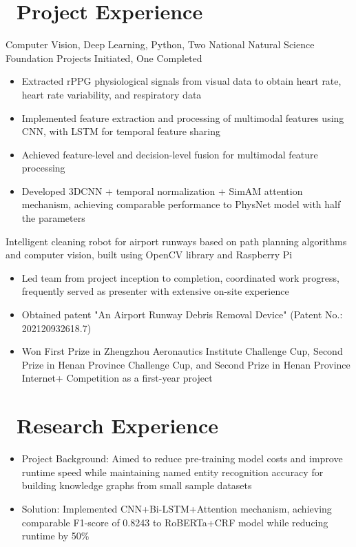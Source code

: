 \documentclass{resume}
\begin{document}
\section{\faUsers\ Project Experience}
Computer Vision, Deep Learning, Python, Two National Natural Science Foundation Projects Initiated, One Completed
\begin{itemize}
  \item Extracted rPPG physiological signals from visual data to obtain heart rate, heart rate variability, and respiratory data
  \item Implemented feature extraction and processing of multimodal features using CNN, with LSTM for temporal feature sharing
  \item Achieved feature-level and decision-level fusion for multimodal feature processing
  \item Developed 3DCNN + temporal normalization + SimAM attention mechanism, achieving comparable performance to PhysNet model with half the parameters
\end{itemize}

Intelligent cleaning robot for airport runways based on path planning algorithms and computer vision, built using OpenCV library and Raspberry Pi
\begin{itemize}
  \item Led team from project inception to completion, coordinated work progress, frequently served as presenter with extensive on-site experience
  \item Obtained patent "An Airport Runway Debris Removal Device" (Patent No.: 202120932618.7)
  \item Won First Prize in Zhengzhou Aeronautics Institute Challenge Cup, Second Prize in Henan Province Challenge Cup, and Second Prize in Henan Province Internet+ Competition as a first-year project
\end{itemize}

\section{\faHeartO\ Research Experience}
\begin{itemize}
  \item Project Background: Aimed to reduce pre-training model costs and improve runtime speed while maintaining named entity recognition accuracy for building knowledge graphs from small sample datasets
  \item Solution: Implemented CNN+Bi-LSTM+Attention mechanism, achieving comparable F1-score of 0.8243 to RoBERTa+CRF model while reducing runtime by 50\%
\end{itemize}
\end{document}
